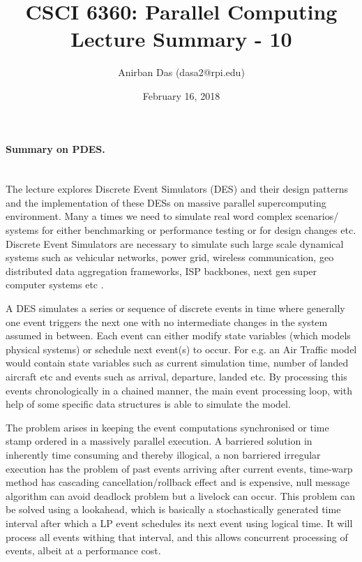 \documentclass[a4paper,12 pt]{article}
\title{\vspace{-2.0cm}CSCI 6360: Parallel Computing Lecture Summary - 10}
\author{Anirban Das (dasa2@rpi.edu) }
\date{February 16, 2018}
\begin{document}
\maketitle

\paragraph{Summary on PDES.\\\\}

The lecture explores Discrete Event Simulators (DES) and their design patterns and the implementation of these DESs on massive parallel supercomputing environment. Many a times we need to simulate real word complex scenarios/ systems for either benchmarking or performance testing or for design changes etc. Discrete Event Simulators are necessary to simulate such large scale dynamical systems such as vehicular networks, power grid, wireless communication, geo distributed data aggregation frameworks, ISP backbones, next gen super computer systems etc .

A DES simulates a series or sequence of discrete events in time where generally one event triggers the next one with no intermediate changes in the system assumed in between. Each event can either modify state variables (which models physical systems) or schedule next event(s) to occur. For e.g. an Air Traffic model would contain state variables such as current simulation time, number of landed aircraft etc and events such as arrival, departure, landed etc. By processing this events chronologically in a chained manner, the main event processing loop, with help of some specific data structures is able to simulate the model.

The problem arises in keeping the event computations synchronised or time stamp ordered in a massively parallel execution. A barriered solution in inherently time consuming and thereby illogical, a non barriered irregular execution has the problem of past events arriving after current events, time-warp method has cascading cancellation/rollback effect and is expensive, null message algorithm can avoid deadlock problem but a livelock can occur. This problem can be solved using a lookahead, which is basically a stochastically generated time interval after which a LP event schedules its next event using logical time. It will process all events withing that interval, and this allows concurrent processing of events, albeit at a performance cost.
\end{document}
